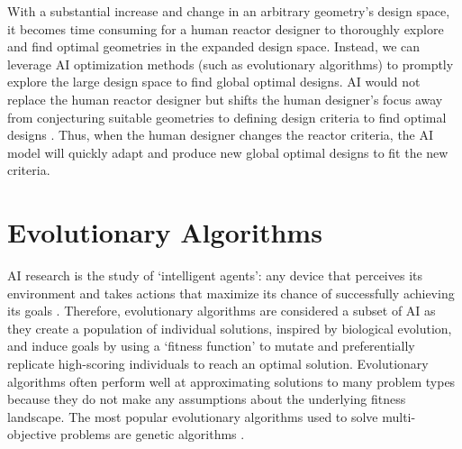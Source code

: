 With a substantial increase and change in an arbitrary geometry's design space, 
it becomes time consuming for a human reactor designer to thoroughly explore 
and find optimal geometries in the expanded design space. 
Instead, we can leverage \gls{AI} optimization methods (such as evolutionary algorithms) to 
promptly explore the large design space to find global optimal designs. 
\gls{AI} would not replace the human reactor designer but shifts the human 
designer's focus away from conjecturing suitable geometries to defining design 
criteria to find optimal designs \cite{sobes_artificial_2020}. 
Thus, when the human designer changes the reactor criteria, the \gls{AI} 
model will quickly adapt and produce new global optimal designs to fit the new 
criteria.  

\section{Evolutionary Algorithms} 
\gls{AI} research is the study of `intelligent agents': any device that perceives 
its environment and takes actions that maximize its chance of successfully 
achieving its goals \cite{david_l_poole_computational_1998}.
Therefore, evolutionary algorithms are considered a subset of \gls{AI} as they create a population 
of individual solutions, inspired by biological evolution, and induce goals by 
using a `fitness function' to mutate and preferentially replicate high-scoring 
individuals to reach an optimal solution.
Evolutionary algorithms often perform well at approximating solutions to many 
problem types because they do not make any assumptions about the 
underlying fitness landscape.
The most popular evolutionary algorithms used to solve multi-objective problems are genetic algorithms 
\cite{byrne_evolving_2014, krish_practical_2011}. 

